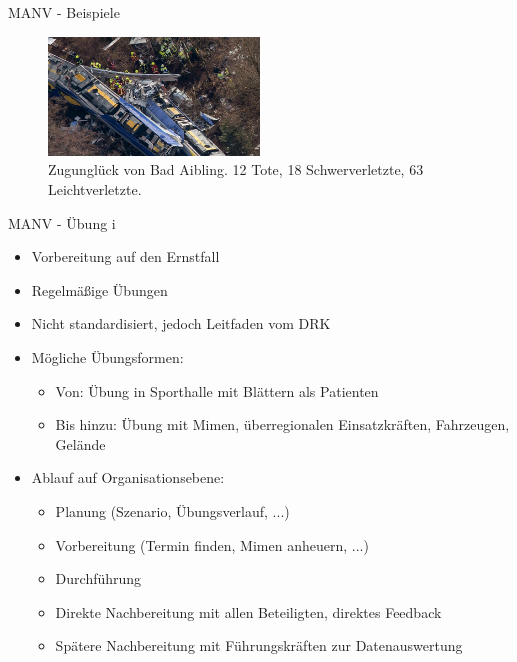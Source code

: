 \begin{frame}{MANV - Beispiele}
	\begin{examples}
		\begin{figure}
			\begin{center}
				\includegraphics[width=0.5\textwidth]{images/bad-aibling.jpg}
			\end{center}
			\caption{Zugunglück von Bad Aibling. 12 Tote, 18 Schwerverletzte, 63 Leichtverletzte.\cite{manv-badaibling}}\label{fig:badaibling}
		\end{figure}
	\end{examples}
\end{frame}


\begin{frame}{MANV - Übung i}
	\begin{itemize}
		\item Vorbereitung auf den Ernstfall
		\item Regelmäßige Übungen
		\item Nicht standardisiert, jedoch Leitfaden vom DRK \cite{kreuz2016durchfuhrung}
		\item Mögliche Übungsformen:
		      \begin{itemize}
			      \item Von: Übung in Sporthalle mit Blättern als Patienten
			      \item Bis hinzu: Übung mit Mimen, überregionalen Einsatzkräften, Fahrzeugen, Gelände
		      \end{itemize}
		\item Ablauf auf Organisationsebene:
		      \begin{itemize}
			      \item Planung (Szenario, Übungsverlauf, ...)
			      \item Vorbereitung (Termin finden, Mimen anheuern, ...)
			      \item Durchführung
			      \item Direkte Nachbereitung mit allen Beteiligten, direktes Feedback
			      \item Spätere Nachbereitung mit Führungskräften zur Datenauswertung
		      \end{itemize}
	\end{itemize}

\end{frame}

